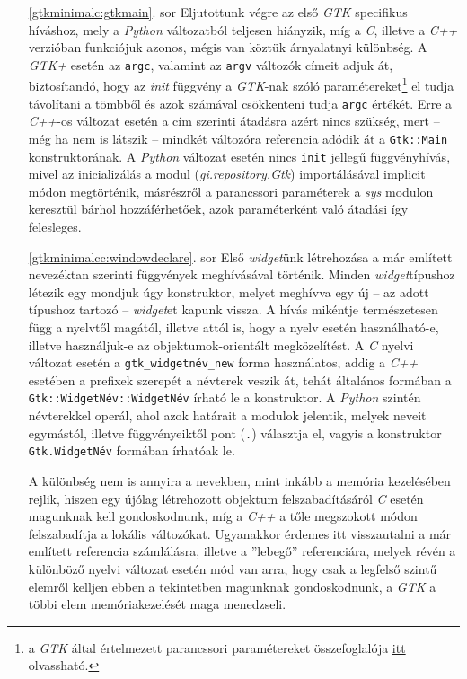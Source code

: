 \begin{enumerate}
 \item[\ref{gtkminimalc:gtkmain}. sor] Eljutottunk végre az első \textit{GTK} specifikus híváshoz, mely a \textit{Python} változatból teljesen hiányzik, míg a \textit{C}, illetve a \textit{C++} verzióban funkciójuk azonos, mégis van köztük árnyalatnyi különbség. A \textit{GTK+} esetén az \texttt{argc}, valamint az \texttt{argv} változók címeit adjuk át, biztosítandó, hogy az \textit{init} függvény a \textit{GTK}-nak szóló paramétereket\footnote{a \textit{GTK} által értelmezett parancssori paramétereket összefoglalója \href{http://library.gnome.org/devel/gtk/stable/gtk-running.html}{itt} olvassható.} el tudja távolítani a tömbből és azok számával csökkenteni tudja \texttt{argc} értékét. Erre a \textit{C++}-os változat esetén a cím szerinti átadásra azért nincs szükség, mert -- még ha nem is látszik -- mindkét változóra referencia adódik át a \texttt{Gtk::Main} konstruktorának. A \textit{Python} változat esetén nincs \texttt{init} jellegű függvényhívás, mivel az inicializálás a modul (\textit{gi.repository.Gtk}) importálásával implicit módon megtörténik, másrészről a parancssori paraméterek a \textit{sys} modulon keresztül bárhol hozzáférhetőek, azok paraméterként való átadási így felesleges.

 \item[\ref{gtkminimalcc:windowdeclare}. sor] Első \textit{widget}ünk létrehozása a már említett nevezéktan szerinti függvények meghívásával történik. Minden \textit{widget}típushoz létezik egy mondjuk úgy konstruktor, melyet meghívva egy új -- az adott típushoz tartozó -- \textit{widget}et kapunk vissza. A hívás mikéntje természetesen függ a nyelvtől magától, illetve attól is, hogy a nyelv esetén használható-e, illetve használjuk-e az objektumok-orientált megközelítést. A \textit{C} nyelvi változat esetén a \texttt{gtk\_widgetnév\_new} forma használatos, addig a \textit{C++} esetében a prefixek szerepét a névterek veszik át, tehát általános formában a \texttt{Gtk::WidgetNév::WidgetNév} írható le a konstruktor. A \textit{Python} szintén névterekkel operál, ahol azok határait a modulok jelentik, melyek neveit egymástól, illetve függvényeiktől pont (\texttt{.}) választja el, vagyis a konstruktor \texttt{Gtk.WidgetNév} formában írhatóak le.

A különbség nem is annyira a nevekben, mint inkább a memória kezelésében rejlik, hiszen egy újólag létrehozott objektum felszabadításáról \textit{C} esetén magunknak kell gondoskodnunk, míg a \textit{C++} a tőle megszokott módon felszabadítja a lokális változókat. Ugyanakkor érdemes itt visszautalni a már említett referencia számlálásra, illetve a ''lebegő'' referenciára, melyek révén a különböző nyelvi változat esetén mód van arra, hogy csak a legfelső szintű elemről kelljen ebben a tekintetben magunknak gondoskodnunk, a \textit{GTK} a többi elem memóriakezelését maga menedzseli.


\end{enumerate}
